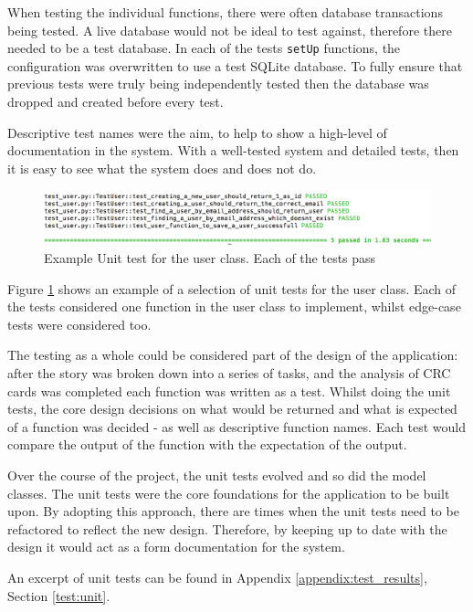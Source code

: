 When testing the individual functions, there were often database transactions being tested. A live database would not be ideal to test against, therefore there needed to be a test database. In each of the tests \texttt{setUp} functions, the configuration was overwritten to use a test SQLite database. To fully ensure that previous tests were truly being independently tested then the database was dropped and created before every test.

Descriptive test names were the aim, to help to show a high-level of documentation in the system. With a well-tested system and detailed tests, then it is easy to see what the system does and does not do.

\begin{figure}[h!]
  \centering
  \includegraphics[width=\textwidth]{images/unit_test_user}
  \caption{Example Unit test for the user class. Each of the tests pass}
  \label{fig:unit_user}
\end{figure}

Figure \ref{fig:unit_user} shows an example of a selection of unit tests for the user class. Each of the tests considered one function in the user class to implement, whilst edge-case tests were considered too.

The testing as a whole could be considered part of the design of the application: after the story was broken down into a series of tasks, and the analysis of CRC cards was completed each function was written as a test. Whilst doing the unit tests, the core design decisions on what would be returned and what is expected of a function was decided - as well as descriptive function names. Each test would compare the output of the function with the expectation of the output.

Over the course of the project, the unit tests evolved and so did the model classes. The unit tests were the core foundations for the application to be built upon. By adopting this approach, there are times when the unit tests need to be refactored to reflect the new design. Therefore, by keeping up to date with the design it would act as a form documentation for the system.

An excerpt of unit tests can be found in Appendix \ref{appendix:test_results}, Section \ref{test:unit}.

